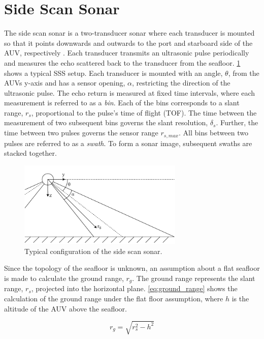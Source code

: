 \section{Side Scan Sonar}

The side scan sonar is a two-transducer sonar where each transducer is mounted so that it points downwards and outwards to the port and starboard side of the AUV, respectively \cite{Burguera2016High-ResolutionSonar}. Each transducer transmits an ultrasonic pulse periodically and measures the echo scattered back to the transducer from the seafloor. \cref{fig:sss} shows a typical SSS setup. Each transducer is mounted with an angle, $\theta$, from the AUVs y-axis and has a sensor opening, $\alpha$, restricting the direction of the ultrasonic pulse. The echo return is measured at fixed time intervals, where each measurement is referred to as a \textit{bin}. Each of the bins corresponds to a slant range, $r_s$, proportional to the pulse's time of flight (TOF). The time between the measurement of two subsequent bins governs the slant resolution, $\delta_s$. Further, the time between two pulses governs the sensor range $r_{s,max}$. All bins between two pulses are referred to as a \textit{swath}. To form a sonar image, subsequent swaths are stacked together.

\begin{figure}
    \centering
    \includegraphics[width=0.7\textwidth]{figures/sss.drawio.pdf}
    \caption{Typical configuration of the side scan sonar.}
    \label{fig:sss}
\end{figure}

Since the topology of the seafloor is unknown, an assumption about a flat seafloor is made to calculate the ground range, $r_g$. The ground range represents the slant range, $r_s$, projected into the horizontal plane. \cref{eq:ground_range} shows the calculation of the ground range under the flat floor assumption, where $h$ is the altitude of the AUV above the seafloor.

\begin{equation}
    r_g = \sqrt{r_s^2 - h^2}
    \label{eq:ground_range}
\end{equation}

